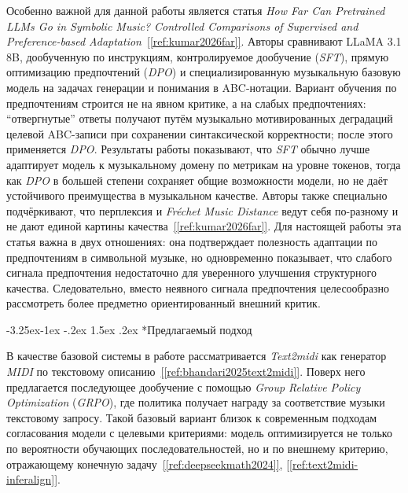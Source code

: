 \documentclass[a4paper,12pt]{extarticle}
\makeatletter
\newcommand{\sourcecite}[1]{\hyperref[#1]{[\ref*{#1}]}}
\renewcommand\subsection{\@startsection{subsection}{2}{\z@}%
  {-3.25ex\@plus -1ex \@minus -.2ex}%
  {1.5ex \@plus .2ex}%
  {\normalfont\large\bfseries\Needspace{6\baselineskip}}}
\makeatother
\begin{document}
Особенно важной для данной работы является статья \textit{How Far Can Pretrained LLMs Go in Symbolic Music? Controlled Comparisons of Supervised and Preference-based Adaptation}~\sourcecite{ref:kumar2026far}. Авторы сравнивают LLaMA 3.1 8B, дообученную по инструкциям, контролируемое дообучение (\textit{SFT}), прямую оптимизацию предпочтений (\textit{DPO}) и специализированную музыкальную базовую модель на задачах генерации и понимания в ABC-нотации. Вариант обучения по предпочтениям строится не на явном критике, а на слабых предпочтениях: ``отвергнутые'' ответы получают путём музыкально мотивированных деградаций целевой ABC-записи при сохранении синтаксической корректности; после этого применяется \textit{DPO}. Результаты работы показывают, что \textit{SFT} обычно лучше адаптирует модель к музыкальному домену по метрикам на уровне токенов, тогда как \textit{DPO} в большей степени сохраняет общие возможности модели, но не даёт устойчивого преимущества в музыкальном качестве. Авторы также специально подчёркивают, что перплексия и \textit{Fréchet Music Distance} ведут себя по-разному и не дают единой картины качества~\sourcecite{ref:kumar2026far}. Для настоящей работы эта статья важна в двух отношениях: она подтверждает полезность адаптации по предпочтениям в символьной музыке, но одновременно показывает, что слабого сигнала предпочтения недостаточно для уверенного улучшения структурного качества. Следовательно, вместо неявного сигнала предпочтения целесообразно рассмотреть более предметно ориентированный внешний критик.

\subsection*{Предлагаемый подход}

В качестве базовой системы в работе рассматривается \textit{Text2midi} как генератор \textit{MIDI} по текстовому описанию~\sourcecite{ref:bhandari2025text2midi}. Поверх него предлагается последующее дообучение с помощью \textit{Group Relative Policy Optimization} (\textit{GRPO}), где политика получает награду за соответствие музыки текстовому запросу. Такой базовый вариант близок к современным подходам согласования модели с целевыми критериями: модель оптимизируется не только по вероятности обучающих последовательностей, но и по внешнему критерию, отражающему конечную задачу~\sourcecite{ref:deepseekmath2024}, \sourcecite{ref:text2midi-inferalign}.
\end{document}
